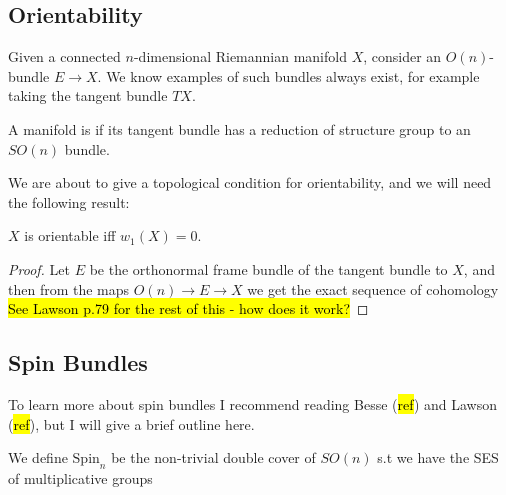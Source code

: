 \documentclass{article}
\begin{document}
\subsection{Orientability}\label{subsec:orientability via steifel whitney}
Given a connected $n$-dimensional Riemannian manifold $X$, consider an $O(n)$-bundle $E \to X$. We know examples of such bundles always exist, for example taking the tangent bundle $TX$. 
\begin{definition}
	A manifold is  if its tangent bundle has a reduction of structure group to an $SO(n)$ bundle. 
\end{definition}

We are about to give a topological condition for orientability, and we will need the following result:

\begin{comment} I think this is wrong. 
\begin{lemma}\label{lemma: 0-Cohomology}
If $M$ is a manifold with $r$ connected components, $H^0(M,F_2) \cong F_2^{r-1}$
\end{lemma}
\begin{proof}
Thinking of $H^0$ as global sections, we know that there is a choice of $\pm 1$ for the value of a section on each component. The overall sign of the section doesn't matter, so we have $r-1$ choices of signs. 
\end{proof}
\end{comment}

\begin{prop}
	$X$ is orientable iff $w_1(X)=0$. 
\end{prop}
\begin{proof}
	Let $E$ be the orthonormal frame bundle of the tangent bundle to $X$, and then from the maps $O(n) \to E \to X$ we get the exact sequence of cohomology
	\hl{See Lawson p.79 for the rest of this - how does it work?}
\end{proof}
\subsection{Spin Bundles}
To learn more about spin bundles I recommend reading Besse (\hl{ref}) and Lawson (\hl{ref}), but I will give a brief outline here. 

\begin{definition}
	We define $\text{Spin}_n$ be the non-trivial double cover of $SO(n)$ s.t we have the SES of multiplicative groups 
\end{definition}
\end{document}
